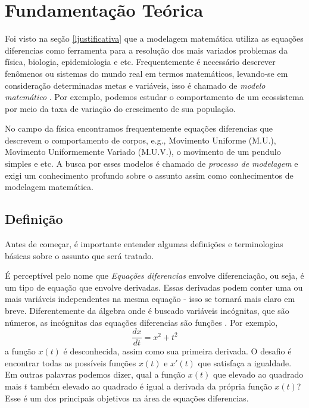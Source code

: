 \section{Fundamentação Teórica}\label{lfundamentacao}
Foi visto na seção \ref{ljustificativa} que a modelagem matemática 
utiliza as equações diferencias como ferramenta para a resolução dos 
mais variados problemas da física, biologia, epidemiologia e etc.
Frequentemente é necessário descrever fenômenos ou sistemas do mundo
real em termos matemáticos, levando-se em consideração determinadas metas
e variáveis, isso é chamado de \emph{modelo matemático} \cite{zill2003equacoes}.
Por exemplo, podemos estudar o comportamento de um ecossistema por meio da taxa
de variação do crescimento de sua população.

No campo da física encontramos frequentemente equações diferencias que descrevem
o comportamento de corpos, e.g., Movimento Uniforme (M.U.), Movimento Uniformemente
Variado (M.U.V.), o movimento de um pendulo simples e etc.
A busca por esses modelos é chamado de \emph{processo de modelagem} e exigi 
um conhecimento profundo sobre o assunto assim como conhecimentos de 
modelagem matemática.

\subsection{Definição}

Antes de começar, é importante entender algumas definições e terminologias 
básicas sobre o assunto que será tratado.

É perceptível pelo nome que \emph{Equações diferencias} envolve 
diferenciação, ou seja, é um tipo de equação que envolve derivadas.
Essas derivadas podem conter uma ou mais variáveis independentes na mesma 
equação - isso se tornará mais claro em breve. Diferentemente da álgebra onde
é buscado variáveis incógnitas, que são números, as incógnitas das equações diferencias são 
funções \cite{diacu}. Por exemplo,
\begin{equation*}
\frac{dx}{dt} = x^{2} + t^{2}
\end{equation*}
a função $x(t)$ é desconhecida, assim como sua primeira derivada. O desafio é
encontrar todas as possíveis funções $x(t)$ e $x'(t)$ que satisfaça a igualdade.
Em outras palavras podemos dizer, qual a função $x(t)$ que elevado ao quadrado mais
$t$ também elevado ao quadrado é igual a derivada da própria função $x(t)$?
Esse é um dos principais objetivos na área de equações diferencias.

